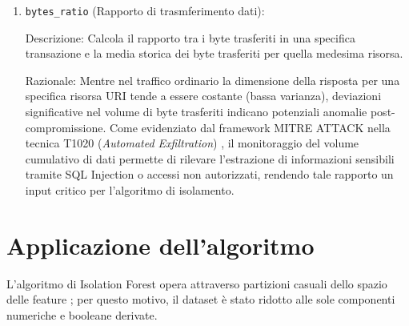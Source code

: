 \begin{enumerate}
\begin{enumerate}
                        Nota Metodologica: Si osserva che nel dataset utilizzato per il presente caso studio, i campi testuali sono stati preventivamente sottoposti a un processo di hashing per ragioni di anonimizzazione e privacy. Poiché le funzioni di hash sono progettate per massimizzare la diffusione e produrre stringhe ad alta entropia indipendentemente dall'input originale, il valore di \texttt{request\_entropy} risulta uniformemente elevato per l'intero dataset. Pertanto, sebbene tale feature sia stata inclusa per completezza metodologica e per dimostrarne il valore predittivo in scenari di monitoraggio in chiaro (dove l'offuscamento malevolo si distingue nettamente dal testo naturale), nel contesto specifico di questo esperimento il suo apporto alla capacità discriminante dell'Isolation Forest è mitigato dalla natura crittografica dei dati sorgente.

                  \item \texttt{bytes\_ratio} (Rapporto di trasmferimento dati):

                        Descrizione: Calcola il rapporto tra i byte trasferiti in una specifica transazione e la media storica dei byte trasferiti per quella medesima risorsa.

                        Razionale: Mentre nel traffico ordinario la dimensione della risposta per una specifica risorsa URI tende a essere costante (bassa varianza), deviazioni significative nel volume di byte trasferiti indicano potenziali anomalie post-compromissione. Come evidenziato dal framework MITRE ATTACK nella tecnica T1020 (\emph{Automated Exfiltration}) \parencite{mitreT1020a}, il monitoraggio del volume cumulativo di dati permette di rilevare l'estrazione di informazioni sensibili tramite SQL Injection o accessi non autorizzati, rendendo tale rapporto un input critico per l'algoritmo di isolamento.



            \end{enumerate}

\end{enumerate}

\section{Applicazione dell'algoritmo}

L’algoritmo di Isolation Forest opera attraverso partizioni casuali dello spazio delle feature \parencite{liu2008isolation}; per questo motivo, il dataset è stato ridotto alle sole componenti numeriche e booleane derivate.


